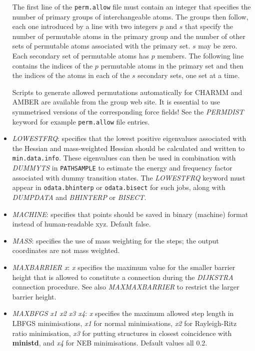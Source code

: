 \documentclass[12pt,a4paper,dvips]{article}
\begin{document}
\begin{itemize}
The first line of the {\tt perm.allow} file must contain an integer
that specifies the number of primary groups of interchangeable atoms.
The groups then follow, each one introduced by a line with two integers $p$ and $s$
that specify the number of permutable atoms in the primary group and the number of other sets
of permutable atoms associated with the primary set.
$s$ may be zero.
Each secondary set of permutable atoms has $p$ members.
The following line contains the indices of the $p$ permutable atoms 
in the primary set and then
the indices of the atoms in each of the $s$ secondary sets, one set at 
a time.

Scripts to generate allowed permutations automatically for CHARMM and AMBER are available from
the group web site. It is essential to use symmetrised versions of the corresponding
force fields! See the {\it PERMDIST\/} keyword for example {\tt perm.allow} file entries.

\item {\it LOWESTFRQ\/}: specifies that the lowest positive eigenvalues associated
with the Hessian and mass-weighted Hessian should be calculated and written to {\tt min.data.info\/}.
These eigenvalues can then be used in combination with {\it DUMMYTS\/} in {\tt PATHSAMPLE}
to estimate the energy and frequency factor associated with dummy transition states.
The {\it LOWESTFRQ\/} keyword must appear in {\tt odata.bhinterp} or {\tt odata.bisect} for
such jobs, along with {\it DUMPDATA\/} and {\it BHINTERP\/} or {\it BISECT\/}.

\item {\it MACHINE\/}: specifies that points should be saved in binary (machine) format instead 
of human-readable xyz. Default false.

\item {\it MASS\/}: specifies the use of mass weighting for the steps; the 
output coordinates are not mass weighted.

\item {\it MAXBARRIER x\/}: {\it x\/} specifies the maximum value for the smaller barrier height that 
is allowed to constitute a connection during the
{\it DIJKSTRA \/}connection procedure.
See also {\it MAXMAXBARRIER\/} to restrict the larger barrier height.

\item {\it MAXBFGS x1 x2 x3 x4\/}: {\it x\/} specifies the maximum allowed step length in LBFGS
minimisations, {\it x1\/} for  normal minimisations, {\it x2\/} for Rayleigh-Ritz ratio
minimisation, {\it x3\/} for putting structures in closest coincidence with
{\bf ministd}, and {\it x4\/} for NEB minimisations. Default values all 0.2.


\end{itemize}
\end{document}
